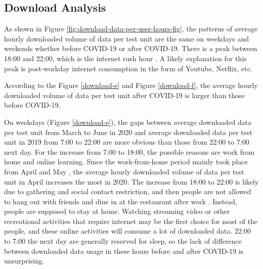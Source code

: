 
\subsection{Download Analysis}
\label{sec:download-analysis}

As shown in Figure \ref{fig:download-data-per-user-hours-fig}, the patterns of average hourly downloaded volume of data per test unit are the same on weekdays and weekends whether before COVID-19 or after COVID-19. There is a peak between 18:00 and 22:00, which is the internet rush hour \cite{internetrushhour}. A likely explanation for this peak is post-workday internet consumption in the form of Youtube, Netflix, etc. 

According to the Figure \ref{download-e} and Figure \ref{download-f}, the average hourly downloaded volume of data per test unit after COVID-19 is larger than those before COVID-19. 

On weekdays (Figure \ref{download-e}), the gaps between average downloaded data per test unit from March to June in 2020 and average downloaded data per test unit in 2019 from 7:00 to 22:00 are more obvious than those from 22:00 to 7:00 next day. For the increase from 7:00 to 18:00, the possible reasons are work from home and online learning. Since the work-from-home period mainly took place from April and May \cite{remotework}, the average hourly downloaded volume of data per test unit in April increases the most in 2020. The increase from 18:00 to 22:00 is likely due to gathering and social contact restriction, and then people are not allowed to hang out with friends and dine in at the restaurant after work \cite{lockdownsguide}. Instead, people are supposed to stay at home. Watching streaming video or other recreational activities that require internet may be the first choice for most of the people, and these online activities will consume a lot of downloaded data. 22:00 to 7:00 the next day are generally reserved for sleep, so the lack of difference between downloaded data usage in these hours before and after COVID-19 is unsurprising. 

